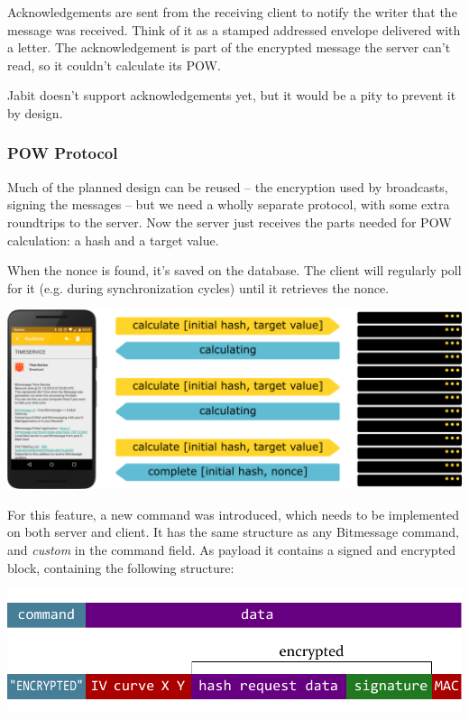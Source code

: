 \documentclass{bfh}
\begin{document}
  Acknowledgements are sent from the receiving client to notify the writer that the message was received. Think of it as a stamped addressed envelope delivered with a letter. The acknowledgement is part of the encrypted message the server can't read, so it couldn't calculate its \ac{POW}.

  Jabit doesn't support acknowledgements yet, but it would be a pity to prevent it by design.

  \subsubsection{\ac{POW} Protocol}
  Much of the planned design can be reused -- the encryption used by broadcasts, signing the messages -- but we need a wholly separate protocol, with some extra roundtrips to the server. Now the server just receives the parts needed for \ac{POW} calculation: a hash and a target value.

  When the nonce is found, it's saved on the database. The client will regularly poll for it (e.g. during synchronization cycles) until it retrieves the nonce.

  \includegraphics[width=\textwidth]{images/server_pow_protocol.pdf}

  For this feature, a new command was introduced, which needs to be implemented on both server and client. It has the same structure as any Bitmessage command, and \textit{custom} in the command field. As payload it contains a signed and encrypted block, containing the following structure:

  \includegraphics[width=\textwidth]{images/custom_message.pdf}
\end{document}
